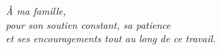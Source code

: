 \vspace*{\fill}
\begin{flushright}
\large\itshape
À ma famille,\\[4pt]
pour son soutien constant, sa patience\\
et ses encouragements tout au long de ce travail.
\end{flushright}
\vspace*{\fill}
